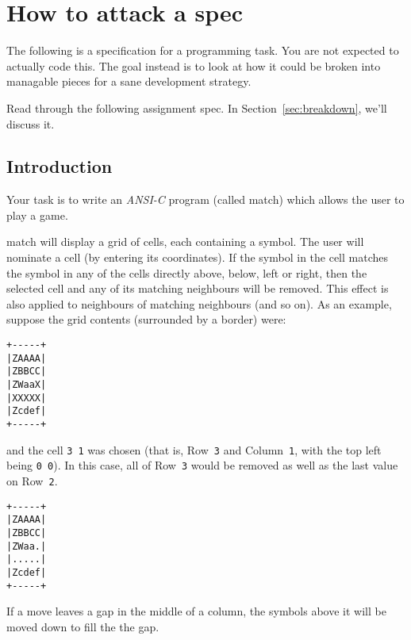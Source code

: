 
\chapter{How to attack a spec}


The following is a specification for a programming task.
You are not expected to actually code this.
The goal instead is to look at how it could be broken into managable pieces 
for a sane development strategy.

Read through the following assignment spec.
In Section~\ref{sec:breakdown}, we'll discuss it.

\section{Introduction}
Your task is to write an \emph{ANSI-C} program (called match) which
allows the user to play a game.

match will display a grid of cells, each containing a symbol.
The user will nominate a cell (by entering its coordinates).
If the symbol in the cell matches the symbol in
any of the cells directly above, below, left or right, then the selected cell and any of its matching neighbours
will be removed.
This effect is also applied to neighbours of matching neighbours (and so on).
As an example, suppose the grid contents (surrounded by a border) were:

\begin{center}
\begin{verbatim}
+-----+
|ZAAAA|
|ZBBCC|
|ZWaaX|
|XXXXX|
|Zcdef|
+-----+
\end{verbatim}
\end{center}
and the cell \texttt{3 1} was chosen (that is, Row~\texttt{3} and Column~\texttt{1}, with the top left being \texttt{0 0}).
In this case, all of Row~\texttt{3} would be removed as well as the last value on Row~\texttt{2}.

\pagebreak
\begin{center}
\begin{verbatim}
+-----+
|ZAAAA|
|ZBBCC|
|ZWaa.|
|.....|
|Zcdef|
+-----+
\end{verbatim}
\end{center}

If a move leaves a gap in the middle of a column, the symbols above it will be moved down to fill the
the gap.

